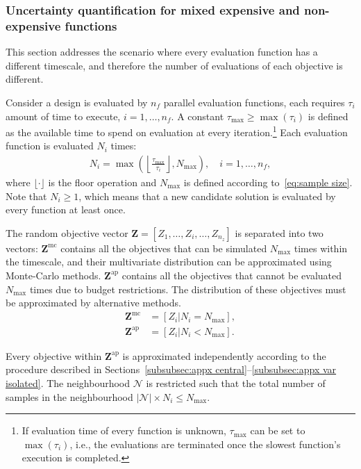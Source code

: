 \documentclass[a4paper]{article}
\newcommand{\brs}[1]{\left[{#1}\right]} %
\newcommand{\brr}[1]{{\left({#1}\right)}} %
\newcommand{\brabs}[1]{\left\vert{#1}\right\vert} %
\newcommand{\vZ}{\ensuremath{\mathbf{Z}}} %
\newcommand{\NSet}{\ensuremath{\mathcal{N}}} %
\begin{document}
\subsubsection{Uncertainty quantification for mixed expensive and non-expensive functions}
\label{subsubsec:mixed complexity functions}
This section addresses the scenario where every evaluation function has a different timescale, and therefore the number of evaluations of each objective is different.

Consider a design is evaluated by $n_f$ parallel evaluation functions, each requires $\tau_i$ amount of time to execute, $i=1,\ldots,n_f$. A constant $\tau_\text{max}\geq \max\brr{\tau_i}$ is defined as the available time to spend on evaluation at every iteration.\footnote{If evaluation time of every function is unknown, $\tau_\text{max}$ can be set to $\max\brr{\tau_i}$, i.e., the evaluations are terminated once the slowest function's execution is completed.} Each evaluation function is evaluated $N_i$ times:
\begin{align}
N_i = \max \brr{ \left\lfloor \frac{\tau_\text{max}}{\tau_i} \right\rfloor , N_\text{max}}, \quad i=1,\ldots,n_f,
\end{align}
where $\lfloor\cdot\rfloor$ is the floor operation and $N_\text{max}$ is defined according to~\eqref{eq:sample size}. Note that $N_i\geq 1$, which means that a new candidate solution is evaluated by every function at least once.

The random objective vector $\vZ=\brs{Z_1,\ldots,Z_i,\ldots,Z_{n_z}}$ is separated into two vectors: $\vZ^\text{mc}$ contains all the objectives that can be simulated $N_\text{max}$ times within the timescale, and their multivariate distribution can be approximated using Monte-Carlo methods. $\vZ^\text{ap}$ contains all the objectives that cannot be evaluated $N_\text{max}$ times due to budget restrictions. The distribution of these objectives must be approximated by alternative methods.
\begin{align}
\label{eq:Z monte carlo} \vZ^\text{mc} &= \brs{Z_i\vert N_i=N_\text{max}}, \\
\label{eq:Z approximate} \vZ^\text{ap} &= \brs{Z_i\vert N_i<N_\text{max}}.
\end{align}

Every objective within $\vZ^\text{ap}$ is approximated independently according to the procedure described in Sections~\ref{subsubsec:appx central}--\ref{subsubsec:appx var isolated}. The neighbourhood $\NSet$ is restricted such that the total number of samples in the neighbourhood $\brabs{\NSet}\times N_i\leq N_\text{max}$.
\end{document}
